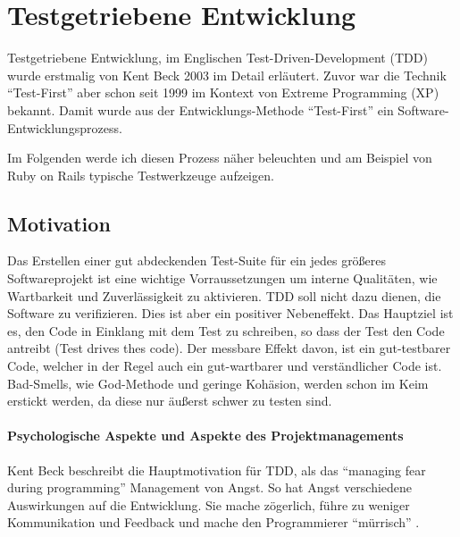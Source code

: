 \section{Testgetriebene Entwicklung}
Testgetriebene Entwicklung, im Englischen Test-Driven-Development (TDD) wurde erstmalig von Kent Beck 2003 im Detail erläutert. Zuvor war die Technik "`Test-First"' aber schon seit 1999 im Kontext von Extreme Programming (XP) bekannt.
Damit wurde aus der Entwicklungs-Methode "`Test-First"' ein Software-Entwicklungsprozess. 

Im Folgenden werde ich diesen Prozess näher beleuchten und am Beispiel von Ruby on Rails typische Testwerkzeuge aufzeigen. 
\subsection{Motivation}
  Das Erstellen einer gut abdeckenden Test-Suite für ein jedes größeres Softwareprojekt ist eine wichtige Vorraussetzungen um interne Qualitäten, wie Wartbarkeit und Zuverlässigkeit zu aktivieren. TDD soll nicht dazu dienen, die Software zu verifizieren. Dies ist aber ein positiver Nebeneffekt. Das Hauptziel ist es, den Code in Einklang mit dem Test zu schreiben, so dass der Test den Code antreibt (Test drives thes code). Der messbare Effekt davon, ist ein gut-testbarer Code, welcher in der Regel auch ein gut-wartbarer und verständlicher Code ist. Bad-Smells, wie God-Methode und geringe Kohäsion, werden schon im Keim erstickt werden, da diese nur äußerst schwer zu testen sind.

  \paragraph{Psychologische Aspekte und Aspekte des Projektmanagements}
  
  Kent Beck beschreibt die Hauptmotivation für TDD, als das "`managing fear during programming"' Management von Angst. So hat Angst verschiedene Auswirkungen auf die Entwicklung. Sie mache zögerlich, führe zu weniger Kommunikation und Feedback und mache den Programmierer "`mürrisch"' \citep[S. xi]{beck_test_2002}.
  
  
